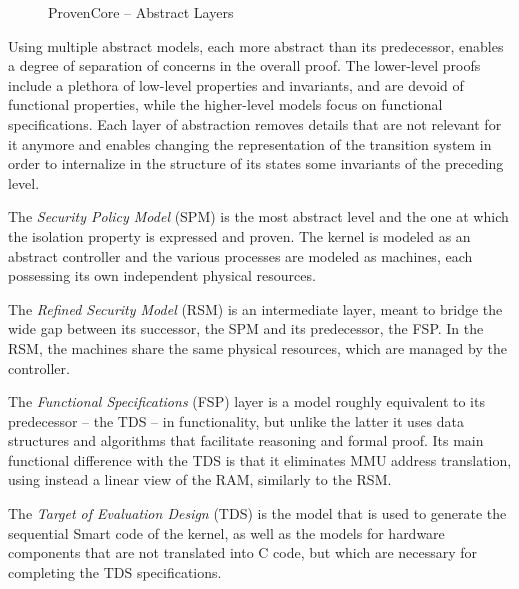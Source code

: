 \documentclass[11pt]{article}
\def\slang{\textsf{Smart}}
\def\pcore{\textsf{ProvenCore}}
\begin{document}
\begin{figure}[hbtp]\centering
{}
\caption{{\pcore} -- Abstract Layers}
\label{fig:pcore:layers}
\end{figure}

Using multiple abstract models, each more abstract than its predecessor, enables
a degree of separation of concerns in the overall proof. The lower-level proofs
include a plethora of low-level properties and invariants, and are devoid of 
functional properties, while the higher-level models focus on functional 
specifications. Each layer of abstraction removes details that are not relevant
for it anymore and enables changing the representation of the transition system
in order to internalize in the structure of its states some invariants of the 
preceding level.

The \emph{Security Policy Model} (SPM) is the most abstract level and the one
at which the isolation property is expressed and proven. The kernel is modeled
as an abstract controller and the various processes are modeled as machines, 
each possessing its own independent physical resources.

The \emph{Refined Security Model} (RSM) is an intermediate layer, meant to 
bridge the wide gap between its successor, the SPM and its predecessor, the FSP. 
In the RSM, the machines share
the same physical resources, which are managed by the controller.

The \emph{Functional Specifications} (FSP) layer is a model roughly equivalent
to its predecessor -- the TDS -- in functionality, but unlike the latter it uses
data structures and algorithms that facilitate reasoning and formal proof. Its
main functional difference with the TDS is that it eliminates MMU address
translation, using instead a linear view of the RAM, similarly to the RSM.

The \emph{Target of Evaluation Design} (TDS) is the model that is used to generate
the sequential {\slang} code of the kernel, as well as the models for hardware
components that are not translated into C code, but which are necessary for
completing the TDS specifications.
\end{document}
